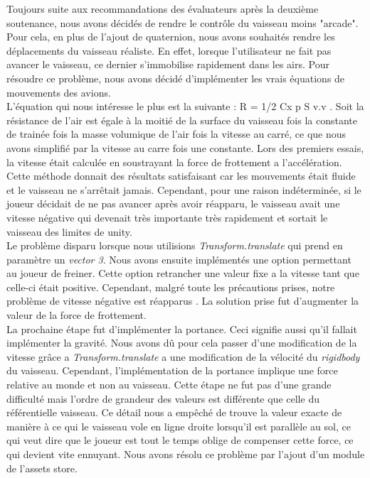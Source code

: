 \documentclass[12pt, titlepage]{article}
\begin{document}
\begin{spacing}{1.5}
Toujours suite aux recommandations des évaluateurs après la deuxième soutenance, nous avons décidés de rendre le contrôle du vaisseau moins "arcade". Pour cela, en plus de l'ajout de quaternion, nous avons souhaités rendre les déplacements du vaisseau réaliste. En effet, lorsque l'utilisateur ne fait pas avancer le vaisseau, ce dernier s'immobilise rapidement dans les airs. Pour résoudre ce problème, nous avons décidé d'implémenter les vrais équations de mouvements des avions.\\

L'équation qui nous intéresse le plus est la suivante : R = 1/2 Cx p S v.v . Soit la résistance de l'air est égale à la moitié de la surface du vaisseau fois la constante de trainée fois la masse volumique de l'air fois la vitesse au carré, ce que nous avons simplifié par la vitesse au carre fois une constante. Lors des premiers essais, la vitesse était calculée en soustrayant la force de frottement a l'accélération. Cette méthode donnait des résultats satisfaisant car les mouvements était fluide et le vaisseau ne s'arrêtait jamais. Cependant, pour une raison indéterminée, si le joueur décidait de ne pas avancer après avoir réapparu, le vaisseau avait une vitesse négative qui devenait très importante très rapidement et sortait le vaisseau des limites de unity. \\

Le problème disparu lorsque nous utilisions \textit{Transform.translate} qui prend en paramètre un \textit{vector 3}. Nous avons ensuite implémentés une option permettant au joueur de freiner. Cette option retrancher une valeur fixe a la vitesse tant que celle-ci était positive. Cependant, malgré toute les précautions prises, notre problème de vitesse négative est réapparus . La solution prise fut d'augmenter la valeur de la force de frottement. \\

La prochaine étape fut d'implémenter la portance. Ceci signifie aussi qu’il fallait implémenter la gravité. Nous avons dû pour cela passer d’une modification de la vitesse grâce a \textit{Transform.translate} a une modification de la vélocité du \textit{rigidbody} du vaisseau. Cependant, l'implémentation de la portance implique une force relative au monde et non au vaisseau. Cette étape ne fut pas d’une grande difficulté mais l'ordre de grandeur des valeurs est différente que celle du référentielle vaisseau. Ce détail nous a empêché de trouve la valeur exacte de manière à ce qui le vaisseau vole en ligne droite lorsqu'il est parallèle au sol, ce qui veut dire que le joueur est tout le temps oblige de compenser cette force, ce qui devient vite ennuyant. Nous avons résolu ce problème par l'ajout d'un module de l'assets store.\\


\end{spacing}
\end{document}
